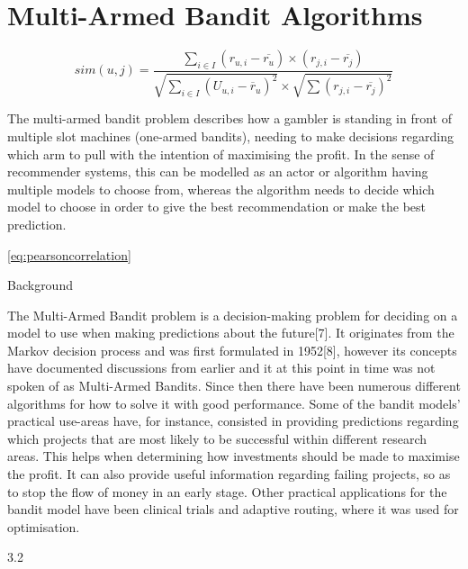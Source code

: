\chapter{Multi-Armed Bandit Algorithms}

\[
\label{eq:pearsoncorrelation} \tag{23}
sim(u, j) = \frac{\sum_{i \in I} \left ( r_{u,i} - \overline{r_{u}} \right ) \times \left ( r_{j,i} - \overline{r_{j}} \right )}{\sqrt{\sum_{i \in I} \left ( U_{u, i} - \overline{r}_{u} \right )^{2}}\times \sqrt{\sum \left ( r_{j,i} - \overline{r_{j}} \right )^{2}}}

\]


\begin{figure}[pearson image correlation]
    {\centering {\texttt{[image: ]}}\par}
\end{figure}

The multi-armed bandit problem describes how a gambler is standing in front of multiple slot machines (one-armed bandits), needing to make decisions regarding which arm to pull with the intention of maximising the profit.
In the sense of recommender systems, this can be modelled as an actor or algorithm having multiple models to choose from, whereas the algorithm needs to decide which model to choose in order to give the best recommendation or make the best prediction.

\eqref{eq:pearsoncorrelation}


Background

The Multi-Armed Bandit problem is a decision-making problem for deciding on a model
to use when making predictions about the future[7]. It originates from the Markov decision process and was first formulated in 1952[8], however its concepts have documented
discussions from earlier and it at this point in time was not spoken of as Multi-Armed
Bandits. Since then there have been numerous different algorithms for how to solve it
with good performance.
Some of the bandit models’ practical use-areas have, for instance, consisted in providing
predictions regarding which projects that are most likely to be successful within different
research areas. This helps when determining how investments should be made to maximise the profit. It can also provide useful information regarding failing projects, so as
to stop the flow of money in an early stage. Other practical applications for the bandit
model have been clinical trials and adaptive routing, where it was used for optimisation.

3.2

